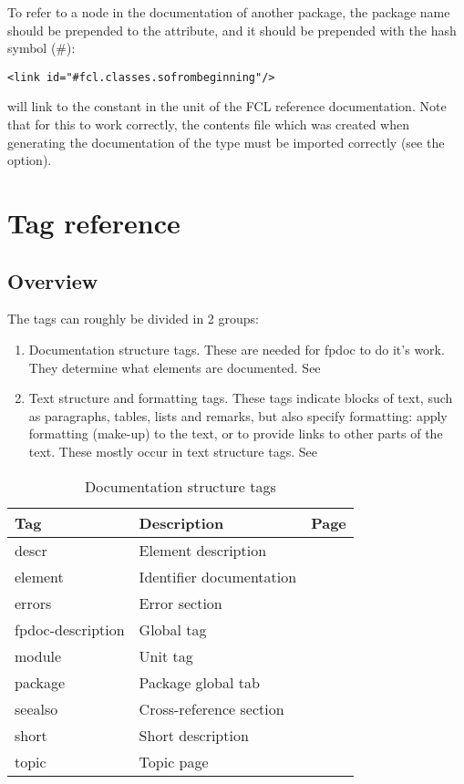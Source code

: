 To refer to a node in the documentation of another package, the package name
should be prepended to the  attribute, and it should be prepended
with the hash symbol (\#):
\begin{verbatim}
<link id="#fcl.classes.sofrombeginning"/>
\end{verbatim}
will link to the constant  in the  unit
of the FCL reference documentation. Note that for this to work correctly,
the contents file which was created when generating the documentation of 
the type must be imported correctly (see the  option).

\section{Tag reference}
\subsection{Overview}
The tags can roughly be divided in 2 groups:
\begin{enumerate}
\item Documentation structure tags. These are needed for fpdoc to do it's
work. They determine what elements are documented. See 
\item Text structure and formatting tags. These tags indicate blocks of text, such as
paragraphs, tables, lists and remarks, but also specify formatting: apply formatting (make-up) 
to the text, or to provide links to other parts of the text. These mostly occur in
text structure tags. See 
\end{enumerate}

\begin{table}[ht]
\caption{Documentation structure tags}\label{tab:structtags}
\begin{tabularx}{\textwidth}{lXr}
Tag & Description & Page \\ \hline
descr & Element description & \pageref{tag:descr} \\
element & Identifier documentation & \pageref{tag:element} \\
errors  & Error section & \pageref{tag:errors} \\
fpdoc-description & Global tag & \pageref{tag:fpdocdescription} \\
module & Unit tag & \pageref{tag:module} \\
package & Package global tab & \pageref{tag:package} \\
seealso & Cross-reference section & \pageref{tag:seealso} \\
short & Short description & \pageref{tag:short} \\ 
topic & Topic page & \pageref{tag:topic} \\ \hline
\end{tabularx}
\end{table}

